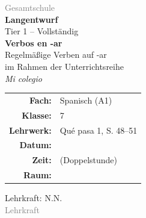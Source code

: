 \documentclass[11pt,a4paper]{article}
\newcommand{\fach}{Spanisch}
\newcommand{\jahrgangsstufe}{7}
\newcommand{\schulart}{Gesamtschule}
\newcommand{\stundenthema}{Verbos en -ar}
\newcommand{\reihenthema}{Mi colegio}
\newcommand{\lehrkraft}{N.N.}
\newcommand{\ausbildungsstand}{Lehrkraft}
\newcommand{\gerniveau}{A1}
\newcommand{\lehrwerk}{Qué pasa 1}
\newcommand{\lehrwerkseite}{S. 48--51}
\begin{document}
\begin{titlepage}
    \centering
    \vspace*{2cm}

    {\large\textcolor{gray}{\schulart}}\\[2cm]

    {\Huge\textcolor{fach}{\textbf{Langentwurf}}}\\[0.5cm]
    {\large Tier 1 -- Vollständig}\\[2cm]

    {\LARGE\textbf{\stundenthema}}\\[0.5cm]
    {\large Regelmäßige Verben auf -ar}\\[0.5cm]
    {\large im Rahmen der Unterrichtsreihe}\\[0.3cm]
    {\Large\textit{\reihenthema}}\\[2cm]

    \begin{tabular}{rl}
        \textbf{Fach:} & \fach{} (\gerniveau) \\[0.3cm]
        \textbf{Klasse:} & \jahrgangsstufe \\[0.3cm]
        \textbf{Lehrwerk:} & \lehrwerk, \lehrwerkseite \\[0.3cm]
        \textbf{Datum:} & \underline{\hspace{3cm}} \\[0.3cm]
        \textbf{Zeit:} & \underline{\hspace{3cm}} (Doppelstunde) \\[0.3cm]
        \textbf{Raum:} & \underline{\hspace{3cm}} \\[0.3cm]
    \end{tabular}

    \vfill

    {\large Lehrkraft: \lehrkraft}\\[0.3cm]
    {\normalsize\textcolor{gray}{\ausbildungsstand}}\\[1cm]

\end{titlepage}

\tableofcontents
\newpage

\end{document}
